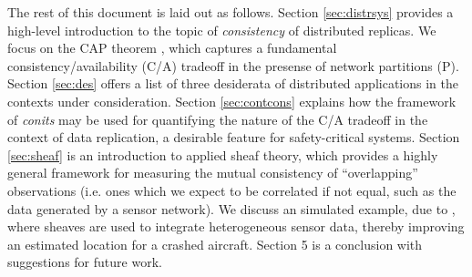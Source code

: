 The rest of this document is laid out as follows. Section
\ref{sec:distrsys} provides a high-level introduction to the topic of
\emph{consistency} of distributed replicas. We focus on the CAP
theorem \cite{2000brewerCAP} \cite{2002gilbertlynchCAP}, which
captures a fundamental consistency/availability (C/A) tradeoff in the
presense of network partitions (P). Section \ref{sec:des} offers a
list of three desiderata of distributed applications in the contexts
under consideration.  Section \ref{sec:contcons} explains how the
framework of \emph{conits} \cite{2002tact} may be used for quantifying
the nature of the C/A tradeoff in the context of data replication, a
desirable feature for safety-critical systems. Section \ref{sec:sheaf}
is an introduction to applied sheaf theory, which provides a highly
general framework for measuring the mutual consistency of
``overlapping'' observations (i.e. ones which we expect to be
correlated if not equal, such as the data generated by a sensor
network). We discuss an simulated example, due to \cite{}, where
sheaves are used to integrate heterogeneous sensor data, thereby
improving an estimated location for a crashed aircraft. Section 5 is a
conclusion with suggestions for future work.
